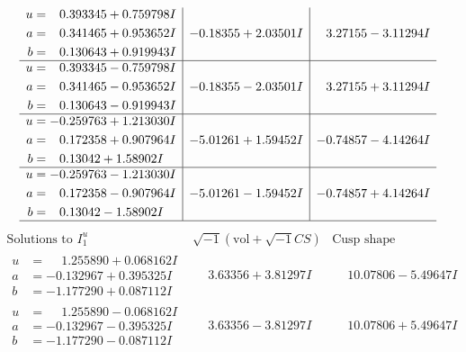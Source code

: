 \documentclass[1p]{elsarticle_modified}
\theoremstyle{definition}
\newcommand{\I}{\sqrt{-1}}
\begin{document}
$$\begin{array}{c|c|c}
\begin{aligned}
u &= \phantom{-}0.393345 + 0.759798 I \\
a &= \phantom{-}0.341465 + 0.953652 I \\
b &= \phantom{-}0.130643 + 0.919943 I\end{aligned}
 & -0.18355 + 2.03501 I & \phantom{-}3.27155 - 3.11294 I \\ \hline\begin{aligned}
u &= \phantom{-}0.393345 - 0.759798 I \\
a &= \phantom{-}0.341465 - 0.953652 I \\
b &= \phantom{-}0.130643 - 0.919943 I\end{aligned}
 & -0.18355 - 2.03501 I & \phantom{-}3.27155 + 3.11294 I \\ \hline\begin{aligned}
u &= -0.259763 + 1.213030 I \\
a &= \phantom{-}0.172358 + 0.907964 I \\
b &= \phantom{-}0.13042 + 1.58902 I\end{aligned}
 & -5.01261 + 1.59452 I & -0.74857 - 4.14264 I \\ \hline\begin{aligned}
u &= -0.259763 - 1.213030 I \\
a &= \phantom{-}0.172358 - 0.907964 I \\
b &= \phantom{-}0.13042 - 1.58902 I\end{aligned}
 & -5.01261 - 1.59452 I & -0.74857 + 4.14264 I\\
 \hline 
 \end{array}$$\newpage$$\begin{array}{c|c|c}  
\text{Solutions to }I^u_{1}& \I (\text{vol} + \sqrt{-1}CS) & \text{Cusp shape}\\
 \hline 
\begin{aligned}
u &= \phantom{-}1.255890 + 0.068162 I \\
a &= -0.132967 + 0.395325 I \\
b &= -1.177290 + 0.087112 I\end{aligned}
 & \phantom{-}3.63356 + 3.81297 I & \phantom{-}10.07806 - 5.49647 I \\ \hline\begin{aligned}
u &= \phantom{-}1.255890 - 0.068162 I \\
a &= -0.132967 - 0.395325 I \\
b &= -1.177290 - 0.087112 I\end{aligned}
 & \phantom{-}3.63356 - 3.81297 I & \phantom{-}10.07806 + 5.49647 I \\ \hline\begin{aligned}

\end{aligned}
\end{array}$$
\end{document}
